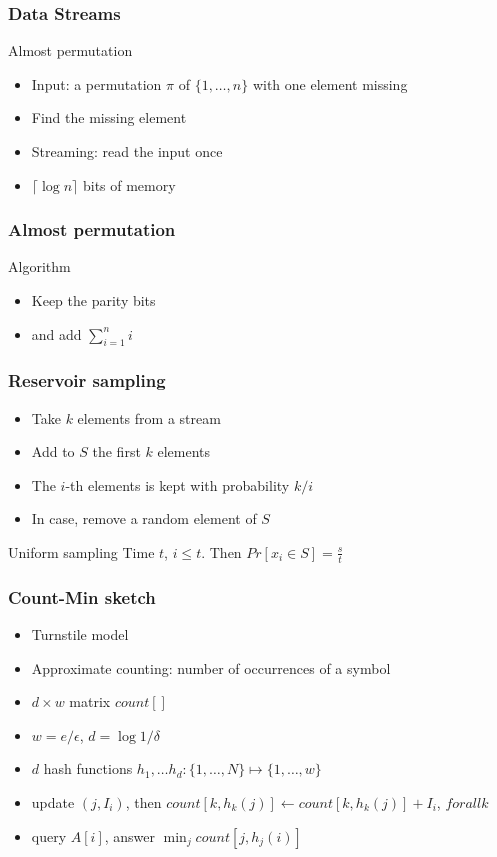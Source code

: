 \documentclass[12pt,aspectratio=169]{beamer}
\begin{document}
\begin{frame}\frametitle{Data Streams}
  \begin{block}{Almost permutation}
    \begin{itemize}
    \item
      Input: a permutation $\pi$ of $\{1, \ldots , n\}$ with one element missing
    \item
      Find the missing element
    \item
      Streaming: read the input once
    \item
      $\lceil \log n \rceil$ bits of memory
    \end{itemize}
  \end{block}
\end{frame}  

\begin{frame}\frametitle{Almost permutation}
  \begin{block}{Algorithm}
    \begin{itemize}
    \item
      Keep the parity bits
    \item
      and add $\sum_{i=1}^{n} i$
    \end{itemize}
  \end{block}
\end{frame}

\begin{frame}\frametitle{Reservoir sampling}
  \begin{itemize}
  \item
    Take $k$ elements from a stream
  \item
    Add to $S$ the first $k$ elements
  \item
    The $i$-th elements is kept with probability $k/i$
  \item
    In case, remove a random element of $S$
  \end{itemize}
  \begin{block}{Uniform sampling}
    Time $t$, $i\le t$.
%
    Then $Pr[x_{i}\in S] = \frac{s}{t}$
  \end{block}
\end{frame}

\begin{frame}\frametitle{Count-Min sketch}
  \begin{itemize}
    \item
      Turnstile model
    \item
    Approximate counting: number of occurrences of a symbol
  \item
    $d\times w$ matrix  $count[]$
  \item
    $w=e/\epsilon$, $d=\log 1/\delta$
  \item
    $d$ hash functions $h_{1}, \ldots h_{d}: \{1, \ldots, N\}\mapsto \{1, \ldots , w\}$
  \item
    update $(j, I_{i})$, then $count[k, h_{k}(j)] \gets count[k, h_{k}(j)] + I_{i}$,
    $forall k$
  \item
    query $A[i]$, answer $\min_{j} count[j, h_{j}(i)]$
  \end{itemize}
\end{frame}
\end{document}
